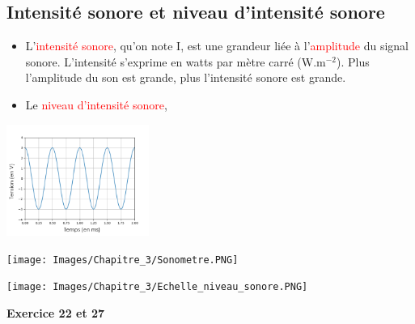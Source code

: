 \subsection{Intensité sonore et niveau d'intensité sonore}
\begin{tcolorbox}[colback=green!5!white,colframe=green!75!black,title=\textbf{Définition :}]
\begin{multicols}{2}
\begin{itemize}[label=\textbullet]
    \item L'\textcolor{red}{intensité sonore}, qu'on note I, est une grandeur liée à l'\textcolor{red}{amplitude} du signal sonore. L'intensité s'exprime en watts par mètre carré (W.m$^{-2}$). Plus l'amplitude du son est grande, plus l'intensité sonore est grande.
    \item Le \textcolor{red}{niveau d'intensité sonore},%
    \end{itemize}
    \vspace{3cm}

\begin{center}
    \includegraphics[width=0.35\textwidth]{Images/Chapitre_3/Signal_diapason.PNG}
\end{center}
\begin{center}
    \texttt{[image: Images/Chapitre\_3/Sonometre.PNG]}
\end{center}
\end{multicols}
\end{tcolorbox}

\begin{center}
    \texttt{[image: Images/Chapitre\_3/Echelle\_niveau\_sonore.PNG]}
\end{center}
\begin{Large}
\end{Large}\textbf{Exercice 22 et 27}